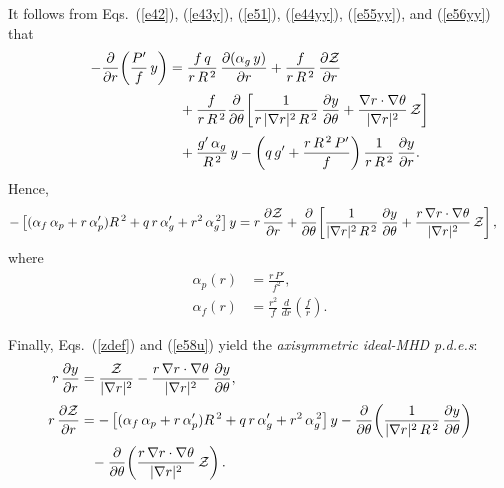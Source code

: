 \documentclass[12pt,prb,aps,notitlepage]{revtex4-1}
\begin{document}
It follows from Eqs.~(\ref{e42}), (\ref{e43y}), (\ref{e51}), (\ref{e44yy}), (\ref{e55yy}), and (\ref{e56yy}) that
\begin{align}
-\frac{\partial}{\partial r}\!\left(\frac{P'}{f}\,y\right)&= \frac{f\,q}{r\,R^{\,2}}\,\frac{\partial (\alpha_g\,y)}{\partial r} 
+ \frac{f}{r\,R^{\,2}}\,\frac{\partial {\cal Z}}{\partial r}\nonumber\\[0.5ex]
&\phantom{=} +\frac{f}{r\,R^{\,2}}\frac{\partial}{\partial\theta}\!\left[\frac{1}{r\,|\nabla r|^2\,R^{\,2}}\,\frac{\partial y}{\partial \theta} + \frac{\nabla r\cdot\nabla\theta}{|\nabla r|^2}\,{\cal Z}\right]
\nonumber\\[0.5ex]
&\phantom{=} + \frac{g'\,\alpha_g}{R^{\,2}}\,y - \left(q\,g'+\frac{r\,R^{\,2}\,P'}{f}\right)\frac{1}{r\,R^{\,2}}\,\frac{\partial y}{\partial r}.
\end{align}
Hence,
\begin{align}\label{e58u}
-\left[(\alpha_f\,\alpha_p+ r\,\alpha_p')R^{\,2} + q\,r\,\alpha_g'+r^2\,\alpha_g^{\,2}\right]y&= 
 r\,\frac{\partial {\cal Z}}{\partial r}+\frac{\partial}{\partial\theta}\!\left[\frac{1}{|\nabla r|^2\,R^{\,2}}\,\frac{\partial y}{\partial \theta} + \frac{r\,\nabla r\cdot\nabla\theta}{|\nabla r|^2}\,{\cal Z}\right],
\end{align}
where
\begin{align}\label{alpp}
\alpha_p(r)&= \frac{r\,P'}{f^2},\\[0.5ex]
\alpha_f(r) &= \frac{r^2}{f}\,\frac{d}{dr}\!\left(\frac{f}{r}\right).\label{alpf}
\end{align}

Finally, Eqs.~(\ref{zdef}) and (\ref{e58u})  yield the {\em axisymmetric ideal-MHD p.d.e.s}:
\begin{align}\label{e63y}
r\,\frac{\partial y}{\partial r} &= \frac{{\cal Z}}{|\nabla r|^2} - \frac{r\,\nabla r\cdot\nabla\theta}{|\nabla r|^2}\,\frac{\partial y}{\partial\theta},\\[0.5ex]
r\,\frac{\partial {\cal Z}}{\partial r}&= -\left[(\alpha_f\,\alpha_p+ r\,\alpha_p')R^{\,2} + q\,r\,\alpha_g'+r^2\,\alpha_g^{\,2}\right]y-\frac{\partial}{\partial\theta}\!\left(\frac{1}{|\nabla r|^2\,R^{\,2}}\,\frac{\partial y}{\partial\theta}\right)\nonumber\\[0.5ex]
&\phantom{=} -\frac{\partial}{\partial\theta}\!\left(\frac{r\,\nabla r\cdot\nabla\theta}{|\nabla r|^2}\,{\cal Z}\right).\label{e64y}
\end{align}
\end{document}
